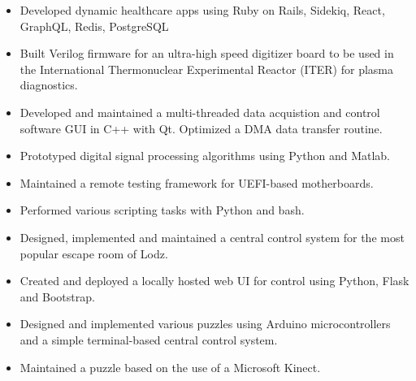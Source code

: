 \documentclass[10pt,a4paper,ragged2e,withhyper]{altacv}
\begin{document}
\begin{paracol}{2}

\begin{itemize}
  \item{Developed dynamic healthcare apps using Ruby on Rails, Sidekiq, React, GraphQL, Redis, PostgreSQL}
\end{itemize}

\divider

\begin{itemize}
  \item Built Verilog firmware for an ultra-high speed digitizer board to be used in the International Thermonuclear Experimental Reactor (ITER) for plasma diagnostics.
  \item Developed and maintained a multi-threaded data acquistion and control software GUI in C++ with Qt. Optimized a DMA data transfer routine.
  \item Prototyped digital signal processing algorithms using Python and Matlab.
\end{itemize}

\divider

\begin{itemize}
  \item Maintained a remote testing framework for UEFI-based motherboards.
  \item Performed various scripting tasks with Python and bash.
\end{itemize}


\begin{itemize}
\item Designed, implemented and maintained a central control system for the most popular escape room of Lodz.
\item Created and deployed a locally hosted web UI for control using Python, Flask and Bootstrap.
\end{itemize}

\divider

\begin{itemize}
\item Designed and implemented various puzzles using Arduino microcontrollers and a simple terminal-based central control system.
\item Maintained a puzzle based on the use of a Microsoft Kinect.
\end{itemize}



\end{paracol}
\end{document}

